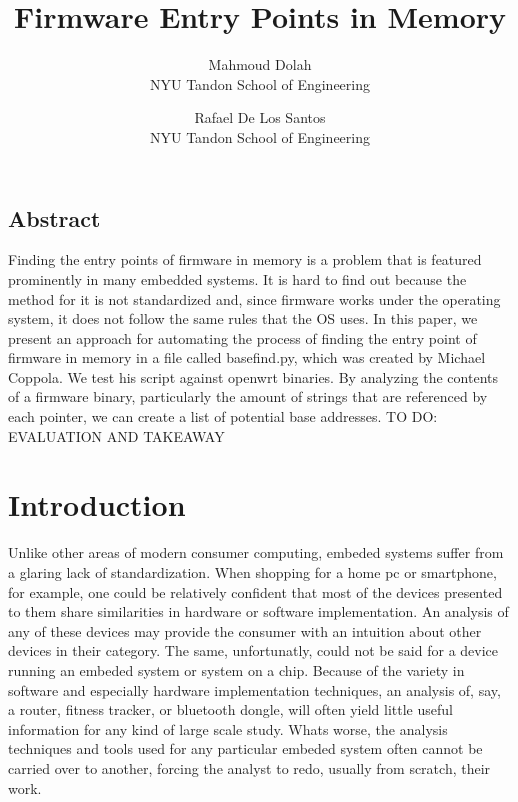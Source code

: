 \documentclass[letterpaper,twocolumn,10pt]{article}
\begin{document}
\title{\Large \bf Firmware Entry Points in Memory}
\author{
    {\rm Mahmoud Dolah}\\
    NYU Tandon School of Engineering
    \and
    {\rm Rafael De Los Santos}\\
    NYU Tandon School of Engineering
}

\date{}

\maketitle

\thispagestyle{empty}

\subsection*{Abstract}
Finding the entry points of firmware in memory is a problem that is featured prominently in many embedded systems. It is hard to find out because the method for it is not standardized and, since firmware works under the operating system, it does not follow the same rules that the OS uses. In this paper, we present an approach for automating the process of finding the entry point of firmware in memory in a file called basefind.py, which was created by Michael Coppola. We test his script against openwrt binaries. By analyzing the contents of a firmware binary, particularly the amount of strings that are referenced by each pointer, we can create a list of potential base addresses.  
TO DO: EVALUATION AND TAKEAWAY

\section{Introduction}
Unlike other areas of modern consumer computing, embeded systems suffer from a glaring lack of standardization. When shopping for a home pc or smartphone, for example, one could be relatively confident that most of the devices presented to them share similarities in hardware or software implementation. An analysis of any of these devices may provide the consumer with an intuition about other devices in their category. The same, unfortunatly, could not be said for a device running an embeded system or system on a chip. Because of the variety in software and especially hardware implementation techniques, an analysis of, say, a router, fitness tracker, or bluetooth dongle, will often yield little useful information for any kind of large scale study. Whats worse, the analysis techniques and tools used for any particular embeded system often cannot be carried over to another, forcing the analyst to redo, usually from scratch, their work.
\end{document}
